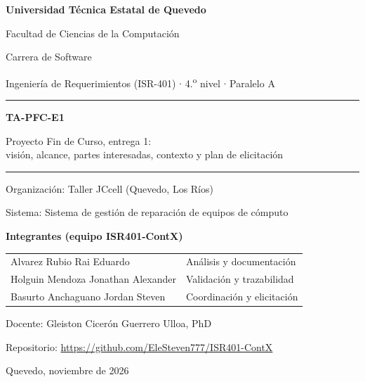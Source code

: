 \documentclass[11pt,a4paper]{article}
\newcommand{\sigla}{ContX}
\newcommand{\organizacion}{Taller JC\textbar{}cell (Quevedo, Los R\'ios)}
\newcommand{\sistema}{Sistema de gesti\'on de reparaci\'on de equipos de c\'omputo}
\newcommand{\repourl}{https://github.com/EleSteven777/ISR401-ContX}
\begin{document}
\hypersetup{pageanchor=false}

\begin{titlepage}
  \centering
  {\Large\bfseries Universidad T\'ecnica Estatal de Quevedo\par}
  \vspace{0.2cm}
  {\large Facultad de Ciencias de la Computaci\'on\par}
  {\large Carrera de Software\par}
  \vspace{1.5cm}
  {\large Ingenier\'ia de Requerimientos (ISR-401) $\cdot$ 4.\textsuperscript{o} nivel $\cdot$ Paralelo A\par}
  \vspace{1.5cm}
  {\color{uteqverde}\rule{\linewidth}{1pt}\par}
  \vspace{0.4cm}
  {\LARGE\bfseries TA-PFC-E1\par}
  \vspace{0.3cm}
  {\Large Proyecto Fin de Curso, entrega 1:\\
   visi\'on, alcance, partes interesadas, contexto y plan de elicitaci\'on\par}
  \vspace{0.4cm}
  {\color{uteqverde}\rule{\linewidth}{1pt}\par}
  \vspace{1cm}
  {\large Organizaci\'on: \organizacion\par}
  {\large Sistema: \sistema\par}
  \vspace{1.5cm}
  {\large\bfseries Integrantes (equipo ISR401-\sigla)\par}
  \vspace{0.3cm}
  {\small
  \noindent\begin{tabularx}{\linewidth}{@{}YY@{}}
    Alvarez Rubio Rai Eduardo & Análisis y documentación \\
    Holguin Mendoza Jonathan Alexander & Validación y trazabilidad \\
    Basurto Anchaguano Jordan Steven & Coordinación y elicitación \\
  \end{tabularx}\par}
  \vfill
  {\large Docente: Gleiston Cicer\'on Guerrero Ulloa, PhD\par}
  \vspace{0.3cm}
  {\large Repositorio: \url{\repourl}\par}
  \vspace{0.3cm}
  {\large Quevedo, noviembre de 2026\par}
\end{titlepage}
\hypersetup{pageanchor=true}
\end{document}
